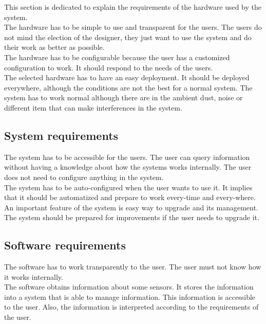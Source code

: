 This section is dedicated to explain the requirements of the hardware used by the system.\\

The hardware has to be simple to use and transparent for the users. The users do not mind the election of the designer, they just want to use the system and do their work as better as possible.\\

The hardware has to be configurable because the user has a customized configuration to work. It should respond to the needs of the users.\\

The selected hardware has to have an easy deployment. It should be deployed everywhere, although the conditions are not the best for a normal system. The system has to work normal although there are in the ambient dust, noise or different item that can make interferences in the system.

\subsection{System requirements}

The system has to be accessible for the users. The user can query information without having a knowledge about how the systems works internally. The user does not need to configure anything in the system.\\

The system has to be auto-configured when the user wants to use it. It implies that it should be automatized and prepare to work every-time and every-where.\\

An important feature of the system is easy way to upgrade and its management. The system should be prepared for improvements if the user needs to upgrade it.

\subsection{Software requirements}

The software has to work transparently to the user. The user must not know how it works internally.\\

The software obtains information about some sensors. It stores the information into a system that is able to manage information. This information is accessible to the user. Also, the information is interpreted according to the requirements of the user.\\

